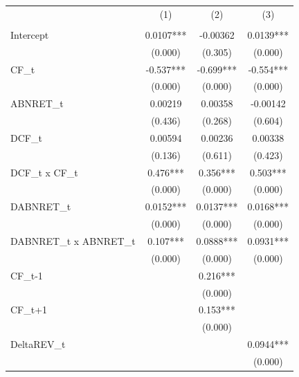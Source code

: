 {
\def\sym#1{\ifmmode^{#1}\else\(^{#1}\)\fi}
\begin{tabular}{l*{3}{c}}
\hline\hline
                    &\multicolumn{1}{c}{(1)}&\multicolumn{1}{c}{(2)}&\multicolumn{1}{c}{(3)}\\
                    &\multicolumn{1}{c}{}&\multicolumn{1}{c}{}&\multicolumn{1}{c}{}\\
\hline
Intercept           &      0.0107***&    -0.00362   &      0.0139***\\
                    &     (0.000)   &     (0.305)   &     (0.000)   \\
[1em]
CF\_t                &      -0.537***&      -0.699***&      -0.554***\\
                    &     (0.000)   &     (0.000)   &     (0.000)   \\
[1em]
ABNRET\_t            &     0.00219   &     0.00358   &    -0.00142   \\
                    &     (0.436)   &     (0.268)   &     (0.604)   \\
[1em]
DCF\_t               &     0.00594   &     0.00236   &     0.00338   \\
                    &     (0.136)   &     (0.611)   &     (0.423)   \\
[1em]
DCF\_t x CF\_t        &       0.476***&       0.356***&       0.503***\\
                    &     (0.000)   &     (0.000)   &     (0.000)   \\
[1em]
DABNRET\_t           &      0.0152***&      0.0137***&      0.0168***\\
                    &     (0.000)   &     (0.000)   &     (0.000)   \\
[1em]
DABNRET\_t x ABNRET\_t&       0.107***&      0.0888***&      0.0931***\\
                    &     (0.000)   &     (0.000)   &     (0.000)   \\
[1em]
CF\_{t-1}            &               &       0.216***&               \\
                    &               &     (0.000)   &               \\
[1em]
CF\_{t+1}            &               &       0.153***&               \\
                    &               &     (0.000)   &               \\
[1em]
DeltaREV\_t          &               &               &      0.0944***\\
                    &               &               &     (0.000)   \\

\end{tabular}}
